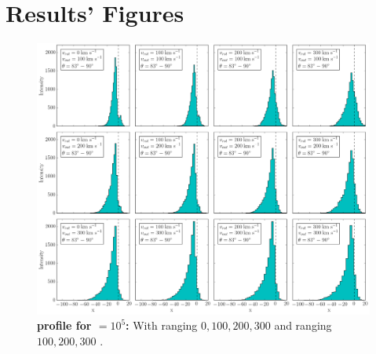 \appendix
\setcounter{chapter}{0}
\renewcommand{\chaptername}{Appendix}
\renewcommand{\theequation}{\Alph{chapter}.\arabic{section}.\arabic{equation}} 
\setcounter{equation}{0}

\chapter{Results' Figures}
\label{first_plots}

\begin{figure}[h!]
	\begin{center}
		\includegraphics[width=1\textwidth]{./figures/chapter3/1_tau10E5_phi83-90}
	\end{center}
	\caption{\textbf{\lya profile for \tauh$=10^5$:} With \vrot ranging $0,100,200,300$ \kms and \vout ranging $100,200,300$ \kms.
		\label{fig:1_tau10E5_phi83-90}}
\end{figure}

\newpage

